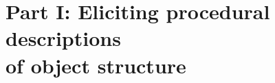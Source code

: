 \documentclass[10pt,letterpaper]{article}
\begin{document}




\section{Part I: Eliciting procedural descriptions \\ of object structure} \label{sec-part-i}
\end{document}

